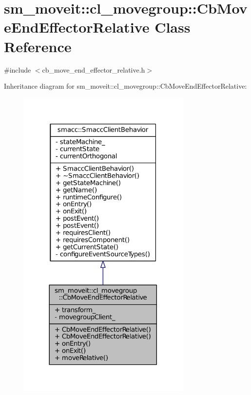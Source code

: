 \hypertarget{classsm__moveit_1_1cl__movegroup_1_1CbMoveEndEffectorRelative}{}\section{sm\+\_\+moveit\+:\+:cl\+\_\+movegroup\+:\+:Cb\+Move\+End\+Effector\+Relative Class Reference}
\label{classsm__moveit_1_1cl__movegroup_1_1CbMoveEndEffectorRelative}


{\ttfamily \#include $<$cb\+\_\+move\+\_\+end\+\_\+effector\+\_\+relative.\+h$>$}



Inheritance diagram for sm\+\_\+moveit\+:\+:cl\+\_\+movegroup\+:\+:Cb\+Move\+End\+Effector\+Relative\+:
\nopagebreak
\begin{figure}[H]
\begin{center}
\leavevmode
\includegraphics[width=245pt]{classsm__moveit_1_1cl__movegroup_1_1CbMoveEndEffectorRelative__inherit__graph}
\end{center}
\end{figure}


